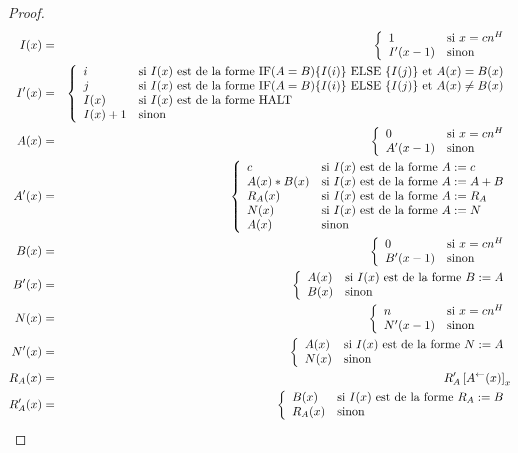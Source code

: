 \documentclass{article}
\newcommand{\sRAMif}[2]{\text{IF} (A=B) \{I( #1 )\} \text{ ELSE } \{I( #2 )\}}
\newcommand{\eqpred}[3]{#1\left[ #2^{\leftarrow}(#3) \right]_{#3}}
\begin{document}
\begin{proof}
{\begin{minipage}{0.9\textwidth}
				\setcounter{equation}{0}
				\begin{eqnarray}
					I(x) & = & \casedist{
							1			& 	\text{si $x = c n^H$} \\
							I'(x-1)		& 	\text{sinon}
							} \\
					I'(x) & = & \casedist{
							i			& 	\text{si $I(x)$ est de la forme $\sRAMif{i}{j}$ et $A(x) = B(x)$} \\
							j			& 	\text{si $I(x)$ est de la forme $\sRAMif{i}{j}$ et $A(x) \neq B(x)$} \\
							I(x)		&  	\text{si $I(x)$ est de la forme $\text{HALT}$} \\
							I(x) + 1 	& 	\text{sinon} 
							} \\
					A(x) & = & \casedist{
							0			& 	\text{si $x = cn^H$} \\
							A'(x-1)		& 	\text{sinon}
							} \\
					A'(x) & = & \casedist{
							c			& 	\text{si $I(x)$ est de la forme $A := c$} \\
							A(x) * B(x)	& 	\text{si $I(x)$ est de la forme $A := A + B$} \\
							R_A(x) 		& 	\text{si $I(x)$ est de la forme $A := R_A$} \\
							N(x)		& 	\text{si $I(x)$ est de la forme $A := N$} \\
							A(x)		& 	\text{sinon}
							} \\
					B(x) & = & \casedist{
							0			& 	\text{si $x = cn^H$} \\
							B'(x-1)		& 	\text{sinon}
							} \\
					B'(x) & = & \casedist{
							A(x)		& 	\text{si $I(x)$ est de la forme $B := A$} \\
							B(x)		& 	\text{sinon}
							} \\
					N(x) & = & \casedist{
							n			& 	\text{si $x = cn^H$} \\
							N'(x-1)		& 	\text{sinon}
							} \\
					N'(x) & = & \casedist{
							A(x)		& 	\text{si $I(x)$ est de la forme $N := A$} \\
							N(x)		& 	\text{sinon}
							} \\
					R_A(x) & = & \eqpred{R_A'}{A}{x} \\
					R_A'(x) & = & \casedist{
							B(x)		& 	\text{si $I(x)$ est de la forme $R_A := B$} \\
							R_A(x)		& 	\text{sinon}
							}
				\end{eqnarray}
			

\end{minipage}}
\end{proof}
\end{document}
